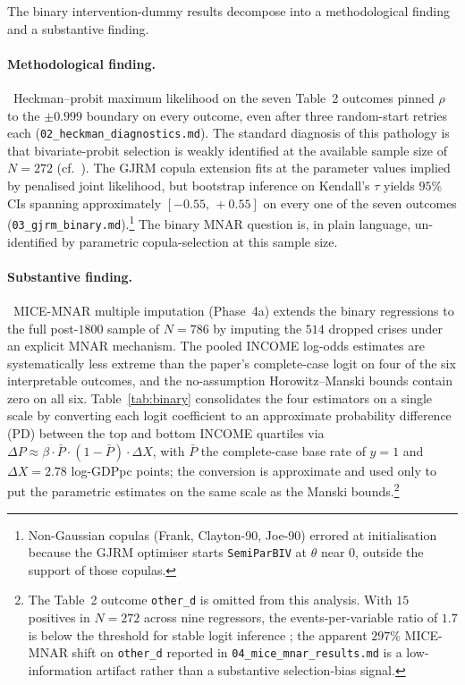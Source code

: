 \documentclass[11pt]{article}
\begin{document}
The binary intervention-dummy results decompose into a methodological
finding and a substantive finding.

\paragraph{Methodological finding.}~Heckman--probit maximum likelihood
on the seven Table~2 outcomes pinned $\rho$ to the $\pm 0.999$ boundary
on every outcome, even after three random-start retries each
(\texttt{02\_heckman\_diagnostics.md}). The standard diagnosis of this
pathology is that bivariate-probit selection is weakly identified at
the available sample size of $N = 272$ (cf.~\citealp{vandeven1981}).
The GJRM copula extension fits at the parameter values implied by
penalised joint likelihood, but bootstrap inference on Kendall's
$\tau$ yields $95\%$ CIs spanning approximately $[-0.55,\,+0.55]$ on
every one of the seven outcomes (\texttt{03\_gjrm\_binary.md}).\footnote{Non-Gaussian
copulas (Frank, Clayton-90, Joe-90) errored at initialisation because
the GJRM optimiser starts \texttt{SemiParBIV} at $\theta$ near $0$,
outside the support of those copulas.} The binary MNAR question is,
in plain language, un-identified by parametric copula-selection at
this sample size.

\paragraph{Substantive finding.}~MICE-MNAR multiple imputation
(Phase~4a) extends the binary regressions to the full post-$1800$
sample of $N = 786$ by imputing the $514$ dropped crises under an
explicit MNAR mechanism. The pooled INCOME log-odds estimates are
systematically less extreme than the paper's complete-case logit on
four of the six interpretable outcomes, and the no-assumption
Horowitz--Manski bounds contain zero on all six.
Table~\ref{tab:binary} consolidates the four estimators on a single
scale by converting each logit coefficient to an approximate
probability difference (PD) between the top and bottom INCOME
quartiles via $\Delta P \approx \beta \cdot \bar{P} \cdot (1 - \bar{P})
\cdot \Delta X$, with $\bar{P}$ the complete-case base rate of $y = 1$
and $\Delta X = 2.78$ log-GDPpc points; the conversion is approximate
and used only to put the parametric estimates on the same scale as
the Manski bounds.\footnote{The Table~2 outcome \texttt{other\_d} is
omitted from this analysis. With $15$ positives in $N = 272$ across
nine regressors, the events-per-variable ratio of $1.7$ is below
the threshold for stable logit inference \citep{peduzzi1996}; the
apparent $297\%$ MICE-MNAR shift on \texttt{other\_d} reported in
\texttt{04\_mice\_mnar\_results.md} is a low-information
artifact rather than a substantive selection-bias signal.}
\end{document}
